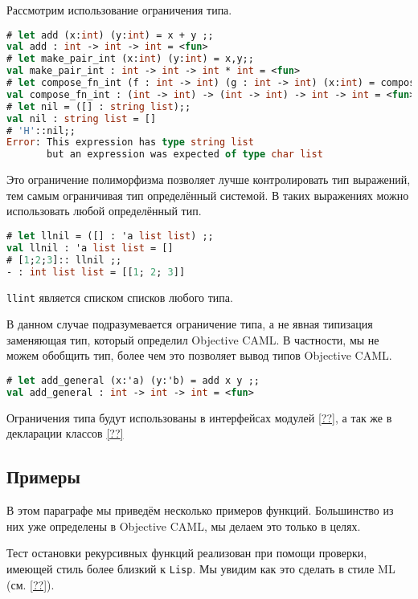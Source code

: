 Рассмотрим использование ограничения типа.

\begin{lstlisting}[language=OCaml]
# let add (x:int) (y:int) = x + y ;;
val add : int -> int -> int = <fun>
# let make_pair_int (x:int) (y:int) = x,y;;
val make_pair_int : int -> int -> int * int = <fun>
# let compose_fn_int (f : int -> int) (g : int -> int) (x:int) = compose f g x;;
val compose_fn_int : (int -> int) -> (int -> int) -> int -> int = <fun>
# let nil = ([] : string list);;
val nil : string list = []
# 'H'::nil;;
Error: This expression has type string list
       but an expression was expected of type char list
\end{lstlisting}

Это ограничение полиморфизма позволяет лучше контролировать тип выражений, тем
самым ограничивая тип определённый системой. В таких выражениях можно
использовать любой определённый тип.

\begin{lstlisting}[language=OCaml]
# let llnil = ([] : 'a list list) ;;
val llnil : 'a list list = []
# [1;2;3]:: llnil ;;
- : int list list = [[1; 2; 3]]
\end{lstlisting}

\texttt{llint} является списком списков любого типа.

В данном случае подразумевается ограничение типа, а не явная типизация
заменяющая тип, который определил Objective CAML. В частности, мы не можем
обобщить тип, более чем это позволяет вывод типов Objective CAML.

\begin{lstlisting}[language=OCaml]
# let add_general (x:'a) (y:'b) = add x y ;;
val add_general : int -> int -> int = <fun>
\end{lstlisting}

Ограничения типа будут использованы в интерфейсах модулей \ref{??}, а так же в
декларации классов \ref{??}

\subsection{Примеры}
\label{sec:caml_kernel:examples}

В этом параграфе мы приведём несколько примеров функций. Большинство из них уже
определены в Objective CAML, мы делаем это только в  целях.

Тест остановки рекурсивных функций реализован при помощи проверки, имеющей стиль
более близкий к \texttt{Lisp}. Мы увидим как это сделать в стиле ML (см.
\ref{??}).

